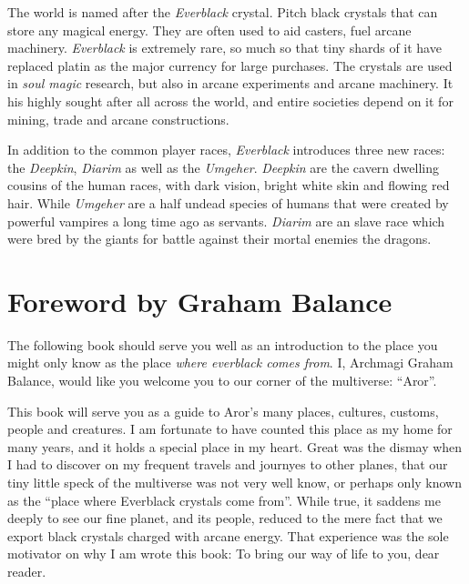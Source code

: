 \begin{enumerate}
  The world is named after the \emph{Everblack} crystal. Pitch
 black crystals that can store any magical energy. They are often used to aid
 casters, fuel arcane machinery. \emph{Everblack} is extremely rare, so much so
 that tiny shards of it have replaced platin as the major currency for large
 purchases. The crystals are used in \emph{soul magic} research, but also in
 arcane experiments and arcane machinery. It his highly sought after all across
 the world, and entire societies depend on it for mining, trade and arcane
 constructions.

  In addition to the common player races, \emph{Everblack}
 introduces three new races: the \emph{Deepkin}, \emph{Diarim} as well as
 the \emph{Umgeher}.  \emph{Deepkin} are the cavern dwelling cousins of the
 human races, with dark vision, bright white skin and flowing red
 hair. While \emph{Umgeher} are a half undead species of humans that were
 created by powerful vampires a long time ago as servants. \emph{Diarim} are
 an slave race which were bred by the giants for battle against their mortal
 enemies the dragons.

\end{enumerate}

\pagebreak

\onecolumn
\section*{Foreword by Graham Balance}

The following book should serve you well as an introduction to the
place you might only know as the place \emph{where everblack comes
  from}. I, Archmagi Graham Balance, would like you welcome you to
our corner of the multiverse: ``Aror''.

This book will serve you as a guide to Aror's many places, cultures,
customs, people and creatures. I am fortunate to have counted this
place as my home for many years, and it holds a special place in my
heart. Great was the dismay when I had to discover on my frequent
travels and journyes to other planes, that our tiny little speck of
the multiverse was not very well know, or perhaps only known as the
``place where Everblack crystals come from''. While true, it saddens
me deeply to see our fine planet, and its people, reduced to the mere
fact that we export black crystals charged with arcane energy. That
experience was the sole motivator on why I am wrote this book: To bring
our way of life to you, dear reader.

